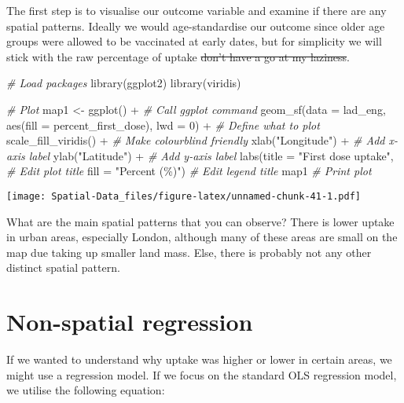 \documentclass[
]{book}
\newenvironment{Shaded}{\begin{snugshade}}{\end{snugshade}}
\newcommand{\AttributeTok}[1]{\textcolor[rgb]{0.77,0.63,0.00}{#1}}
\newcommand{\CommentTok}[1]{\textcolor[rgb]{0.56,0.35,0.01}{\textit{#1}}}
\newcommand{\DecValTok}[1]{\textcolor[rgb]{0.00,0.00,0.81}{#1}}
\newcommand{\FunctionTok}[1]{\textcolor[rgb]{0.00,0.00,0.00}{#1}}
\newcommand{\NormalTok}[1]{#1}
\newcommand{\OtherTok}[1]{\textcolor[rgb]{0.56,0.35,0.01}{#1}}
\newcommand{\SpecialCharTok}[1]{\textcolor[rgb]{0.00,0.00,0.00}{#1}}
\newcommand{\StringTok}[1]{\textcolor[rgb]{0.31,0.60,0.02}{#1}}
\begin{document}
The first step is to visualise our outcome variable and examine if there are any spatial patterns. Ideally we would age-standardise our outcome since older age groups were allowed to be vaccinated at early dates, but for simplicity we will stick with the raw percentage of uptake \sout{don't have a go at my laziness}.

\begin{Shaded}
\begin{Highlighting}[]
\CommentTok{\# Load packages}
\FunctionTok{library}\NormalTok{(ggplot2) }
\FunctionTok{library}\NormalTok{(viridis)}

\CommentTok{\# Plot}
\NormalTok{map1 }\OtherTok{\textless{}{-}} \FunctionTok{ggplot}\NormalTok{() }\SpecialCharTok{+} \CommentTok{\# Call ggplot command}
  \FunctionTok{geom\_sf}\NormalTok{(}\AttributeTok{data =}\NormalTok{ lad\_eng, }\FunctionTok{aes}\NormalTok{(}\AttributeTok{fill =}\NormalTok{ percent\_first\_dose), }\AttributeTok{lwd =} \DecValTok{0}\NormalTok{) }\SpecialCharTok{+} \CommentTok{\# Define what to plot}
  \FunctionTok{scale\_fill\_viridis}\NormalTok{() }\SpecialCharTok{+} \CommentTok{\# Make colourblind friendly}
  \FunctionTok{xlab}\NormalTok{(}\StringTok{"Longitude"}\NormalTok{) }\SpecialCharTok{+} \CommentTok{\# Add x{-}axis label}
  \FunctionTok{ylab}\NormalTok{(}\StringTok{"Latitude"}\NormalTok{) }\SpecialCharTok{+} \CommentTok{\# Add y{-}axis label}
  \FunctionTok{labs}\NormalTok{(}\AttributeTok{title =} \StringTok{"First dose uptake"}\NormalTok{, }\CommentTok{\# Edit plot title}
       \AttributeTok{fill =} \StringTok{"Percent (\%)"}\NormalTok{) }\CommentTok{\# Edit legend title}
\NormalTok{map1 }\CommentTok{\# Print plot}
\end{Highlighting}
\end{Shaded}

\texttt{[image: Spatial-Data\_files/figure-latex/unnamed-chunk-41-1.pdf]}

What are the main spatial patterns that you can observe? There is lower uptake in urban areas, especially London, although many of these areas are small on the map due taking up smaller land mass. Else, there is probably not any other distinct spatial pattern.

\hypertarget{non-spatial-regression}{%
\section{Non-spatial regression}\label{non-spatial-regression}}

If we wanted to understand why uptake was higher or lower in certain areas, we might use a regression model. If we focus on the standard OLS regression model, we utilise the following equation:
\end{document}
